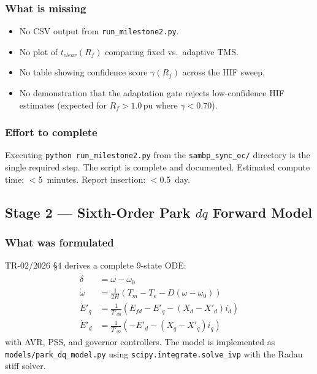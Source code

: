 \documentclass[12pt,a4paper]{article}
\newcommand{\pu}{\,\text{pu}}
\begin{document}
\subsubsection{What is missing}
\begin{itemize}
  \item No CSV output from \texttt{run\_milestone2.py}.
  \item No plot of $t_{clear}(R_f)$ comparing fixed vs.\ adaptive TMS.
  \item No table showing confidence score $\gamma(R_f)$ across the HIF sweep.
  \item No demonstration that the adaptation gate rejects low-confidence HIF
        estimates (expected for $R_f > 1.0\pu$ where $\gamma < 0.70$).
\end{itemize}

\subsubsection{Effort to complete}
Executing \texttt{python run\_milestone2.py} from the \texttt{sambp\_sync\_oc/}
directory is the single required step.  The script is complete and documented.
Estimated compute time: $<$5~minutes.  Report insertion: $<$0.5~day.

\subsection{Stage 2 — Sixth-Order Park $dq$ Forward Model}
\label{sec:gap:stage2}

\subsubsection{What was formulated}

TR-02/2026 \S4 derives a complete 9-state ODE:
\begin{align}
\dot{\delta} &= \omega - \omega_0 \\
\dot{\omega} &= \frac{1}{2H}(T_m - T_e - D(\omega - \omega_0)) \\
\dot{E}'_q &= \frac{1}{T'_{d0}}(E_{fd} - E'_q - (X_d - X'_d)i_d) \\
\dot{E}'_d &= \frac{1}{T'_{q0}}(-E'_d - (X_q - X'_q)i_q)
\end{align}
with AVR, PSS, and governor controllers.  The model is implemented as
\texttt{models/park\_dq\_model.py} using \texttt{scipy.integrate.solve\_ivp}
with the Radau stiff solver.
\end{document}
